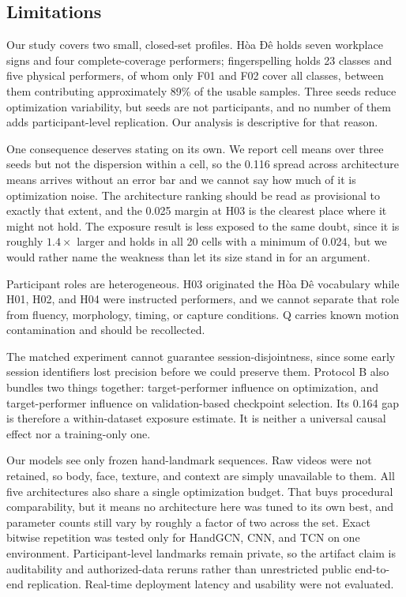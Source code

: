 \subsection{Limitations}

Our study covers two small, closed-set profiles. Hòa Đê holds seven workplace signs and four complete-coverage performers; fingerspelling holds 23 classes and five physical performers, of whom only F01 and F02 cover all classes, between them contributing approximately 89\% of the usable samples. Three seeds reduce optimization variability, but seeds are not participants, and no number of them adds participant-level replication. Our analysis is descriptive for that reason.

One consequence deserves stating on its own. We report cell means over three seeds but not the dispersion within a cell, so the 0.116 spread across architecture means arrives without an error bar and we cannot say how much of it is optimization noise. The architecture ranking should be read as provisional to exactly that extent, and the 0.025 margin at H03 is the clearest place where it might not hold. The exposure result is less exposed to the same doubt, since it is roughly $1.4\times$ larger and holds in all 20 cells with a minimum of 0.024, but we would rather name the weakness than let its size stand in for an argument.

Participant roles are heterogeneous. H03 originated the Hòa Đê vocabulary while H01, H02, and H04 were instructed performers, and we cannot separate that role from fluency, morphology, timing, or capture conditions. Q carries known motion contamination and should be recollected.

The matched experiment cannot guarantee session-disjointness, since some early session identifiers lost precision before we could preserve them. Protocol B also bundles two things together: target-performer influence on optimization, and target-performer influence on validation-based checkpoint selection. Its 0.164 gap is therefore a within-dataset exposure estimate. It is neither a universal causal effect nor a training-only one.

Our models see only frozen hand-landmark sequences. Raw videos were not retained, so body, face, texture, and context are simply unavailable to them. All five architectures also share a single optimization budget. That buys procedural comparability, but it means no architecture here was tuned to its own best, and parameter counts still vary by roughly a factor of two across the set. Exact bitwise repetition was tested only for HandGCN, CNN, and TCN on one environment. Participant-level landmarks remain private, so the artifact claim is auditability and authorized-data reruns rather than unrestricted public end-to-end replication. Real-time deployment latency and usability were not evaluated.

